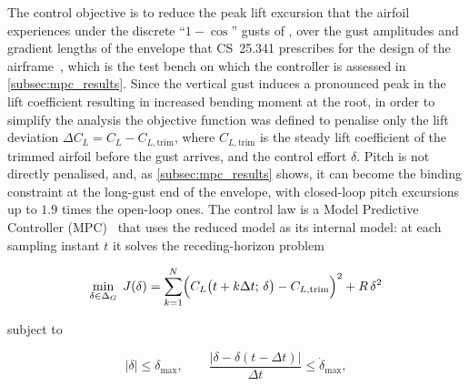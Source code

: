 The control objective is to reduce the peak lift excursion that the airfoil experiences under the discrete ``$1-\cos$'' gusts of , over the gust amplitudes and gradient lengths of the envelope that \mbox{CS~25.341} prescribes for the design of the airframe~\cite{EASA_CS25}, which is the test bench on which the controller is assessed in \cref{subsec:mpc_results}. Since the vertical gust induces a pronounced peak in the lift coefficient resulting in increased bending moment at the root, in order to simplify the analysis the objective function was defined to penalise only the lift deviation $\Delta C_L = C_L - C_{L,\text{trim}}$, where $C_{L,\text{trim}}$ is the steady lift coefficient of the trimmed airfoil before the gust arrives, and the control effort $\delta$. Pitch is not directly penalised, and, as \cref{subsec:mpc_results} shows, it can become the binding constraint at the long-gust end of the envelope, with closed-loop pitch excursions up to $1.9$ times the open-loop ones. The control law is a Model Predictive Controller (MPC)~\cite{rawlings2017mpc,giesseler2012mpc} that uses the reduced model  as its internal model: at each sampling instant $t$ it solves the receding-horizon problem

\begin{equation}
\min_{\delta \in \Delta_G} \; J(\delta) = \sum_{k=1}^{N} \Bigl(C_L\bigl(t+k\Delta t;\,\delta\bigr) - C_{L,\text{trim}}\Bigr)^2
+ R\,\delta^2
\label{eq:mpc_cost}
\end{equation}

subject to

\begin{equation}
\bigl|\delta\bigr| \leq \delta_{\max}, \qquad
\frac{\bigl|\delta - \delta(t-\Delta t)\bigr|}{\Delta t} \leq \dot{\delta}_{\max},
\label{eq:mpc_constraints}
\end{equation}


